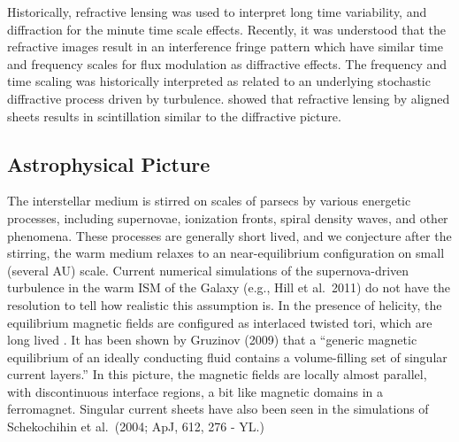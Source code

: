 \documentclass[useAMS,usenatbib]{mn2e}
\begin{document}
Historically, refractive lensing was used to interpret long time
variability, and diffraction for the minute time scale
effects. Recently, it was understood that the refractive images result
in an interference fringe pattern\cite{2004MNRAS.354...43W} which have
similar time and frequency scales for flux modulation as diffractive
effects.  The frequency and time scaling was historically interpreted
as related to an underlying stochastic diffractive process driven by
turbulence.
\cite{2006ApJ...640L.159G} showed that refractive lensing by aligned
sheets  results in
scintillation similar to the diffractive picture.







\subsection{Astrophysical Picture}

The interstellar medium is stirred on scales of parsecs by various
energetic processes, including supernovae, ionization fronts, spiral
density waves, and other phenomena.  These processes are generally
short lived, and we conjecture after the stirring, the warm medium
relaxes to an near-equilibrium configuration on small (several AU)
scale. Current numerical simulations of the supernova-driven
turbulence in the warm ISM of the Galaxy (e.g., Hill et al.~2011) do
not have the resolution to tell how realistic this assumption is.  In
the presence of helicity, the equilibrium magnetic fields are
configured as interlaced twisted tori, which are long lived
\citep{2004Natur.431..819B}.  It has been shown by Gruzinov (2009)
that a ``generic magnetic equilibrium of an ideally conducting fluid
contains a volume-filling set of singular current layers.'' In this
picture, the magnetic fields are locally almost parallel, with
discontinuous interface regions, a bit like magnetic domains in a
ferromagnet. Singular current sheets have also been seen in the
simulations of Schekochihin et al.~(2004; ApJ, 612, 276 - YL.)
\end{document}
